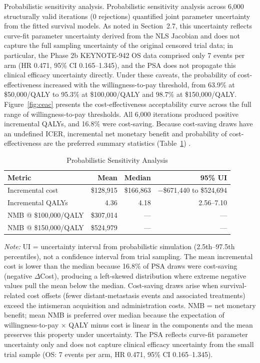 \documentclass[12pt,a4paper]{article}
\begin{document}
Probabilistic sensitivity analysis. Probabilistic sensitivity analysis across 6,000 structurally valid iterations (0 rejections) quantified joint parameter uncertainty from the fitted survival models. As noted in Section~2.7, this uncertainty reflects curve-fit parameter uncertainty derived from the NLS Jacobian and does not capture the full sampling uncertainty of the original censored trial data; in particular, the Phase 2b KEYNOTE-942 OS data comprised only 7 events per arm (HR 0.471, 95\% CI 0.165--1.345), and the PSA does not propagate this clinical efficacy uncertainty directly. Under these caveats, the probability of cost-effectiveness increased with the willingness-to-pay threshold, from 63.9\% at \$50,000/QALY to 95.3\% at \$100,000/QALY and 98.7\% at \$150,000/QALY. Figure~\ref{fig:ceac} presents the cost-effectiveness acceptability curve across the full range of willingness-to-pay thresholds. All 6,000 iterations produced positive incremental QALYs, and 16.8\% were cost-saving. Because cost-saving draws have an undefined ICER, incremental net monetary benefit and probability of cost-effectiveness are the preferred summary statistics (Table~\ref{tab:psa}) \cite{stinnett1998}.

\begin{table}[H]
\centering
\caption{Probabilistic Sensitivity Analysis}
\label{tab:psa}
\begin{tabular}{lrrr}
\toprule
\textbf{Metric} & \textbf{Mean} & \textbf{Median} & \textbf{95\% UI} \\
\midrule
Incremental cost  & \$128,915 & \$166,863 & $-$\$671,440 to \$524,694 \\
Incremental QALYs & 4.36      & 4.18      & 2.56--7.10 \\
NMB @ \$100,000/QALY & \$307,014 & --- & --- \\
NMB @ \$150,000/QALY & \$524,979 & --- & --- \\
\bottomrule
\end{tabular}
\vspace{4pt}
\begin{minipage}[t]{\linewidth}
\footnotesize
\textit{Note:} UI = uncertainty interval from probabilistic simulation (2.5th--97.5th percentiles), not a confidence interval from trial sampling. The mean incremental cost is lower than the median because 16.8\% of PSA draws were cost-saving (negative $\Delta$Cost), producing a left-skewed distribution where extreme negative values pull the mean below the median. Cost-saving draws arise when survival-related cost offsets (fewer distant-metastasis events and associated treatments) exceed the intismeran acquisition and administration costs. NMB = net monetary benefit; mean NMB is preferred over median because the expectation of willingness-to-pay $\times$ QALY minus cost is linear in the components and the mean preserves this property under uncertainty. The PSA reflects curve-fit parameter uncertainty only and does not capture clinical efficacy uncertainty from the small trial sample (OS: 7 events per arm, HR 0.471, 95\% CI 0.165--1.345).
\end{minipage}
\end{table}
\end{document}
